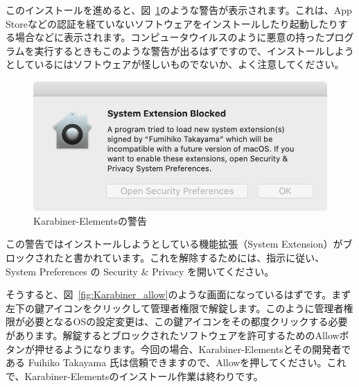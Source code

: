 このインストールを進めると、図~\ref{fig:Karabiner_blocked}のような警告が表示されます。これは、App Storeなどの認証を経ていないソフトウェアをインストールしたり起動したりする場合などに表示されます。コンピュータウイルスのように悪意の持ったプログラムを実行するときもこのような警告が出るはずですので、インストールしようとしているにはソフトウェアが怪しいものでないか、よく注意してください。

\begin{figure}
  \centering
  \includegraphics[scale=0.35]{fig/Karabiner_blocked.png}
  \caption{Karabiner-Elementsの警告}
  \label{fig:Karabiner_blocked}
\end{figure}

この警告ではインストールしようとしている機能拡張（System Extension）がブロックされたと書かれています。これを解除するためには、指示に従い、System Preferences の Security \& Privacy を開いてください。

そうすると、図~\ref{fig:Karabiner_allow}のような画面になっているはずです。まず左下の鍵アイコンをクリックして管理者権限で解錠します。このように管理者権限が必要となるOSの設定変更は、この鍵アイコンをその都度クリックする必要があります。解錠するとブロックされたソフトウェアを許可するためのAllowボタンが押せるようになります。今回の場合、Karabiner-Elementsとその開発者である Fuihiko Takayama 氏は信頼できますので、Allowを押してください。これで、Karabiner-Elementsのインストール作業は終わりです。

